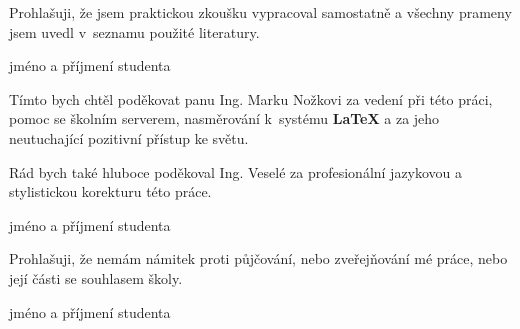 
\newenvironment{signaturedtext}{}{%
	\newline
    \begin{flushright}
		\begin{minipage}[H]{.5\textwidth}
			\begin{center}
				\dotfill\newline
				jméno a příjmení studenta
			\end{center}		
		\end{minipage}
	\end{flushright}
}

\clearpage
\thispagestyle{empty}

\begin{signaturedtext}
	Prohlašuji, že jsem praktickou zkoušku vypracoval samostatně a všechny prameny jsem uvedl v~seznamu použité literatury.
\end{signaturedtext}

\vspace*{\fill}

\begin{signaturedtext}
	Tímto bych chtěl poděkovat panu Ing. Marku Nožkovi za vedení při této práci, pomoc se školním serverem, nasměrování k~systému \textbf{\LaTeX} a za jeho neutuchající pozitivní přístup ke světu.

	Rád bych také hluboce poděkoval Ing. Veselé za profesionální jazykovou a stylistickou korekturu této práce.
\end{signaturedtext}
	
\vfill
	
\begin{signaturedtext}
	Prohlašuji, že nemám námitek proti půjčování, nebo zveřejňování mé práce, nebo její části se souhlasem školy.
\end{signaturedtext}

\clearpage